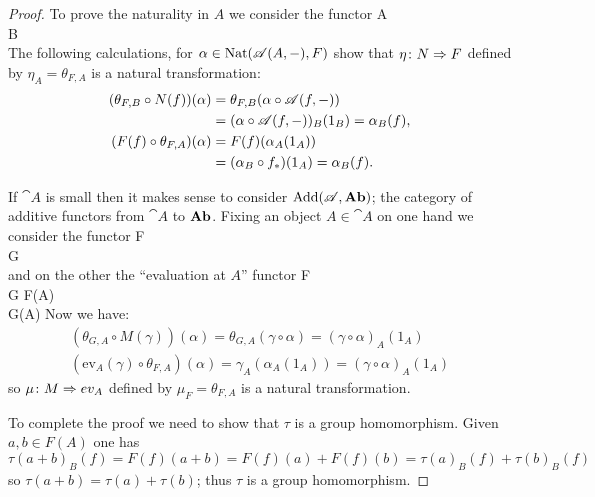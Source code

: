 \begin{proof}
  To prove the naturality in \(A\) we consider the functor
  {A \ar[d, "\displaystyle f"']\\ B}
  { \\ }
  The following calculations, for \(\alpha\in\text{\normalfont Nat}({\mathscr A}(A,-),F)\) show that \(\eta\colon N\Rightarrow F\) defined by \(\eta_A = \theta_{F,A}\) is a natural transformation:
  \begin{align*}
    (\theta_{F,B}\circ N(f))(\alpha) &= \theta_{F,B}(\alpha\circ{\mathscr A}(f,-))\\
                                     &= (\alpha\circ{\mathscr A}(f,-))_B(1_B) = \alpha_B(f),\\
    (F(f)\circ\theta_{F,A})(\alpha)  &= F(f)(\alpha_A(1_A))\\
                                     &= (\alpha_B\circ{f}_*)(1_A) = \alpha_B(f).
  \end{align*}

  If \(\cat{A}\) is small then it makes sense to consider \(\text{Add}({\mathscr A},\text{\normalfont\textbf{Ab}})\); the category of additive functors from \(\cat{A}\) to \(\text{\normalfont\textbf{Ab}}\). Fixing an object \(A\in\cat{A}\) on one hand we consider the functor
  {F \\ G}
  { \\ }
  and on the other the ``evaluation at \(A\)'' functor
  {F \\ G}
  {F(A) \\ G(A)}
  Now we have:
  \begin{gather*}
    (\theta_{G,A}\circ M(\gamma))(\alpha) = \theta_{G,A}(\gamma\circ\alpha) = (\gamma\circ\alpha)_A(1_A)\\
    (\text{ev}_A(\gamma)\circ\theta_{F,A})(\alpha) = \gamma_A(\alpha_A(1_A)) = (\gamma\circ\alpha)_A(1_A)
  \end{gather*}
  so \(\mu\colon M\Rightarrow ev_A\) defined by \(\mu_F = \theta_{F,A}\) is a natural transformation.

  To complete the proof we need to show that \(\tau\) is a group homomorphism. Given \(a,b\in F(A)\) one has
  \begin{equation*}
    \tau(a + b)_B(f) = F(f)(a + b) = F(f)(a) + F(f)(b) = \tau(a)_B(f) + \tau(b)_B(f)
  \end{equation*}
  so \(\tau(a + b) = \tau(a) + \tau(b)\); thus \(\tau\) is a group homomorphism.
\end{proof}

